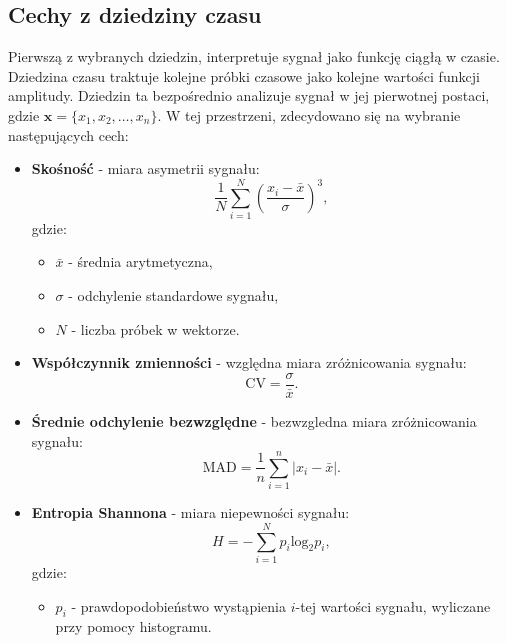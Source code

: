 \documentclass[a4paper,twoside,12pt]{book}
\begin{document}
\subsection*{Cechy z dziedziny czasu}
Pierwszą z wybranych dziedzin, interpretuje sygnał jako funkcję ciągłą w czasie. Dziedzina czasu traktuje kolejne próbki czasowe jako kolejne wartości funkcji amplitudy. Dziedzin ta bezpośrednio analizuje sygnał w jej pierwotnej postaci, gdzie $\textbf{x} = \{x_1, x_2, \ldots, x_n\}$. W tej przestrzeni, zdecydowano się na wybranie następujących cech:
\newpage
\begin{itemize}
	\item \textbf{Skośność} - miara asymetrii sygnału:
	      \begin{equation}
		      \frac{1}{N} \sum_{i=1}^{N} \left( \frac{x_i - \bar{x}}{\sigma} \right)^3,
	      \end{equation}
	      \noindent gdzie:
	      \begin{itemize}
		      \item \( \bar{x} \) - średnia arytmetyczna,
		      \item \( \sigma \) - odchylenie standardowe sygnału,
		      \item $N$ - liczba próbek w wektorze.
	      \end{itemize}
	\item \textbf{Współczynnik zmienności} -  względna miara zróżnicowania sygnału:
	      \begin{equation}
		      \text{CV} = \frac{\sigma}{\bar{x}}.
	      \end{equation}
	\item \textbf{Średnie odchylenie bezwzględne} - bezwzgledna miara zróżnicowania sygnału:
	      \begin{equation}
		      \text{MAD} = \frac{1}{n} \sum_{i=1}^{n} \left| x_i - \bar{x} \right|.
	      \end{equation}

	\item \textbf{Entropia Shannona} - miara niepewności sygnału:
	      \begin{equation}
		      H = -\sum_{i=1}^{N} p_i \mathrm{log}_{2} p_i,
	      \end{equation}
	      \noindent gdzie:
	      \begin{itemize}
		      \item \( p_i \) - prawdopodobieństwo wystąpienia \( i \)-tej wartości sygnału, wyliczane przy pomocy histogramu.
	      \end{itemize}





\end{itemize}
\end{document}
